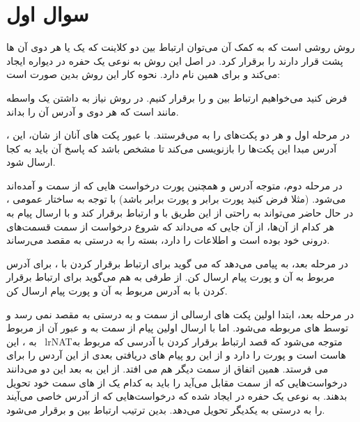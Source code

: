 \documentclass[12pt]{article}
\begin{document}
	\KashidaOff
	
	\section{سوال اول}


روش  روشی است که به کمک آن می‌توان ارتباط بین دو کلاینت که یک یا هر دوی آن ها پشت  قرار دارند را برقرار کرد. در اصل این روش به نوعی یک حفره در دیواره  ایجاد می‌کند و برای همین  نام دارد. نحوه کار این روش بدین صورت است:

فرض کنید می‌خواهیم ارتباط بین  و  را برقرار کنیم. در روش  نیاز به داشتن یک واسطه مانند  است که هر دوی  و  آدرس  آن را بداند.

در مرحله اول  و  هر دو پکت‌های  را به  می‌فرستند. با عبور پکت های آنان از  شان، این ، آدرس  مبدا این پکت‌ها را بازنویسی می‌کند تا مشخص باشد که پاسخ آن باید به کجا ارسال شود.

در مرحله دوم،  متوجه  آدرس و همچنین پورت درخواست هایی که از سمت  و  آمده‌اند می‌شود. (مثلا فرض کنید پورت  برابر  و پورت  برابر  باشد) با توجه به ساختار عمومی ، در حال حاضر  می‌تواند به راحتی از این طریق با  و  ارتباط برقرار کند و با ارسال پیام به  هر کدام از آن‌ها، از آن جایی که  می‌داند که شروع درخواست از سمت قسمت‌های درونی خود بوده است و اطلاعات را دارد، بسته را به درستی به مقصد می‌رساند.

در مرحله بعد،  به  پیامی می‌دهد که می گوید برای ارتباط برقرار کردن با ، برای آدرس  مربوط به  آن و پورت  پیام ارسال کن. از طرفی به هم می‌گوید برای ارتباط برقرار کردن با  به آدرس  مربوط به  آن و پورت  پیام ارسال کن.

در مرحله بعد، ابتدا اولین پکت های ارسالی از سمت  و  به درستی به مقصد نمی رسد و توسط های مربوطه  می‌شود. اما با ارسال اولین پیام از سمت  به  و عبور آن از  مربوط به ، این \ lr{NAT}متوجه می‌شود که  قصد ارتباط برقرار کردن با  آدرسی که مربوط به  هاست  است و پورت  را دارد و از این رو پیام های دریافتی بعدی از این آردس را برای  می فرستد. همین اتفاق از سمت  دیگر هم می افتد. از این به بعد این دو  می‌دانند درخواست‌هایی که از سمت مقابل می‌آید را باید به کدام یک از  های سمت خود تحویل بدهند. به نوعی یک حفره در  ایجاد شده که درخواست‌هایی که از آدرس خاصی می‌آیند را به درستی به یکدیگر تحویل می‌دهد. بدین ترتیب ارتباط  بین  و  برقرار می‌شود.
\end{document}
